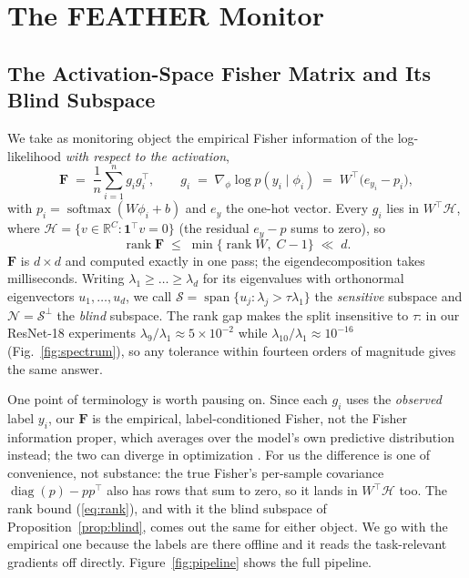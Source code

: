 \documentclass[acmsmall,screen]{acmart}
\theoremstyle{acmdefinition}
\newcommand{\R}{\mathbb{R}}
\newcommand{\F}{\mathbf{F}}
\newcommand{\act}{\phi}
\DeclareMathOperator{\rank}{rank}
\DeclareMathOperator{\diag}{diag}
\DeclareMathOperator{\spn}{span}
\DeclareMathOperator*{\softmax}{softmax}
\begin{document}
\section{The FEATHER Monitor}
\label{sec:method}

\subsection{The Activation-Space Fisher Matrix and Its Blind Subspace}
\label{sec:blind}

We take as monitoring object the empirical Fisher information of the
log-likelihood \emph{with respect to the activation},
\begin{equation}
  \F \;=\; \frac{1}{n}\sum_{i=1}^{n} g_i g_i^\top,
  \qquad
  g_i \;=\; \nabla_{\act}\log p(y_i \mid \act_i)
        \;=\; W^\top\!\big(e_{y_i} - p_i\big),
  \label{eq:fisher}
\end{equation}
with $p_i = \softmax(W\act_i + b)$ and $e_y$ the one-hot vector. Every $g_i$
lies in $W^\top\!\mathcal{H}$, where
$\mathcal{H} = \{v \in \R^C : \mathbf{1}^\top v = 0\}$ (the residual
$e_y - p$ sums to zero), so
\begin{equation}
  \rank \F \;\le\; \min\{\rank W,\; C-1\} \;\ll\; d .
  \label{eq:rank}
\end{equation}
$\F$ is $d \times d$ and computed exactly in one pass; the eigendecomposition
takes milliseconds. Writing $\lambda_1 \ge \dots \ge \lambda_d$ for its
eigenvalues with orthonormal eigenvectors $u_1,\dots,u_d$, we call
$\mathcal{S} = \spn\{u_j : \lambda_j > \tau\lambda_1\}$ the \emph{sensitive}
subspace and $\mathcal{N} = \mathcal{S}^\perp$ the \emph{blind} subspace. The
rank gap makes the split insensitive to $\tau$: in our ResNet-18 experiments
$\lambda_9/\lambda_1 \approx 5 \times 10^{-2}$ while
$\lambda_{10}/\lambda_1 \approx 10^{-16}$ (Fig.~\ref{fig:spectrum}), so any
tolerance within fourteen orders of magnitude gives the same answer.

One point of terminology is worth pausing on. Since each $g_i$ uses the
\emph{observed} label $y_i$, our $\F$ is the empirical, label-conditioned
Fisher, not the Fisher information proper, which averages over the model's own
predictive distribution instead; the two can diverge in optimization
\cite{kunstner2019empirical}. For us the difference is one of convenience, not
substance: the true Fisher's per-sample covariance $\diag(p) - pp^\top$ also
has rows that sum to zero, so it lands in $W^\top\!\mathcal{H}$ too. The rank
bound (\ref{eq:rank}), and with it the blind subspace of
Proposition~\ref{prop:blind}, comes out the same for either object. We go with
the empirical one because the labels are there offline and it reads the
task-relevant gradients off directly. Figure~\ref{fig:pipeline} shows the full
pipeline.
\end{document}
